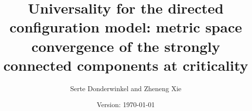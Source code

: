 \documentclass[notitlepage,11pt, a4paper]{article}
\title{Universality for the directed configuration model: metric space convergence of the strongly connected components at criticality}
\author{Serte Donderwinkel and Zheneng Xie}
\date{Version: \today}
\begin{document}
\maketitle








\newpage 

\begin{appendices}
%



\end{appendices}


\end{document}
